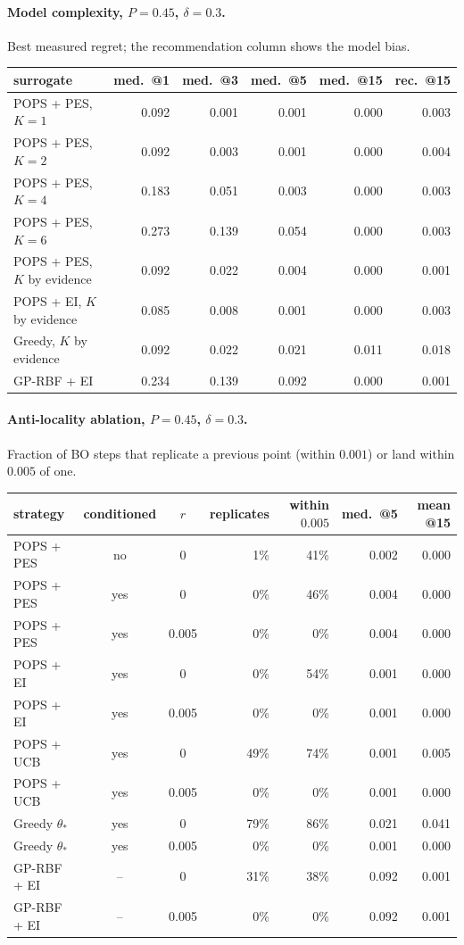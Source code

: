 \paragraph{Model complexity, $P=0.45$, $\delta=0.3$.} Best measured regret; the recommendation column shows the model bias.

\begin{center}\small\begin{tabular}{lrrrrr}\toprule
surrogate & med.\ @1 & med.\ @3 & med.\ @5 & med.\ @15 & rec.\ @15\\\midrule
POPS + PES, $K=1$ & 0.092 & 0.001 & 0.001 & 0.000 & 0.003\\
POPS + PES, $K=2$ & 0.092 & 0.003 & 0.001 & 0.000 & 0.004\\
POPS + PES, $K=4$ & 0.183 & 0.051 & 0.003 & 0.000 & 0.003\\
POPS + PES, $K=6$ & 0.273 & 0.139 & 0.054 & 0.000 & 0.003\\
POPS + PES, $K$ by evidence & 0.092 & 0.022 & 0.004 & 0.000 & 0.001\\
POPS + EI, $K$ by evidence & 0.085 & 0.008 & 0.001 & 0.000 & 0.003\\
Greedy, $K$ by evidence & 0.092 & 0.022 & 0.021 & 0.011 & 0.018\\
GP-RBF + EI & 0.234 & 0.139 & 0.092 & 0.000 & 0.001\\
\bottomrule\end{tabular}\end{center}

\paragraph{Anti-locality ablation, $P=0.45$, $\delta=0.3$.} Fraction of BO steps that replicate a previous point (within $0.001$) or land within $0.005$ of one.

\begin{center}\small\begin{tabular}{lccrrrr}\toprule
strategy & conditioned & $r$ & replicates & within $0.005$ & med.\ @5 & mean @15\\\midrule
POPS + PES & no & 0 & 1\% & 41\% & 0.002 & 0.000\\
POPS + PES & yes & 0 & 0\% & 46\% & 0.004 & 0.000\\
POPS + PES & yes & 0.005 & 0\% & 0\% & 0.004 & 0.000\\
POPS + EI & yes & 0 & 0\% & 54\% & 0.001 & 0.000\\
POPS + EI & yes & 0.005 & 0\% & 0\% & 0.001 & 0.000\\
POPS + UCB & yes & 0 & 49\% & 74\% & 0.001 & 0.005\\
POPS + UCB & yes & 0.005 & 0\% & 0\% & 0.001 & 0.000\\
Greedy $\theta_*$ & yes & 0 & 79\% & 86\% & 0.021 & 0.041\\
Greedy $\theta_*$ & yes & 0.005 & 0\% & 0\% & 0.001 & 0.000\\
GP-RBF + EI & -- & 0 & 31\% & 38\% & 0.092 & 0.001\\
GP-RBF + EI & -- & 0.005 & 0\% & 0\% & 0.092 & 0.001\\
\bottomrule\end{tabular}\end{center}

